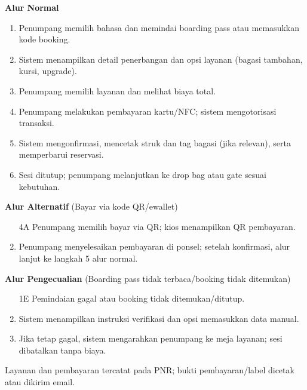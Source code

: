 \documentclass[a4paper]{article}
\begin{document}
\begin{enumerate}[itemsep=1em]
\begin{itemize}[itemsep=1em]
    \vspace{1em}

    \textbf{Alur Normal}
    \begin{enumerate}[nosep]
      \item Penumpang memilih bahasa dan memindai boarding pass atau memasukkan kode booking.
      \item Sistem menampilkan detail penerbangan dan opsi layanan (bagasi tambahan, kursi, upgrade).
      \item Penumpang memilih layanan dan melihat biaya total.
      \item Penumpang melakukan pembayaran kartu/NFC; sistem mengotorisasi transaksi.
      \item Sistem mengonfirmasi, mencetak struk dan tag bagasi (jika relevan), serta memperbarui reservasi.
      \item Sesi ditutup; penumpang melanjutkan ke drop bag atau gate sesuai kebutuhan.
    \end{enumerate}

    \vspace{1em}

    \textbf{Alur Alternatif} (Bayar via kode QR/ewallet)
    \begin{enumerate}[nosep]
      \item[4A] Penumpang memilih bayar via QR; kios menampilkan QR pembayaran.
      \item Penumpang menyelesaikan pembayaran di ponsel; setelah konfirmasi, alur lanjut ke langkah 5 alur normal.
    \end{enumerate}

    \vspace{1em}
    \textbf{Alur Pengecualian} (Boarding pass tidak terbaca/booking tidak ditemukan)
    \begin{enumerate}[nosep]
      \item[1E] Pemindaian gagal atau booking tidak ditemukan/ditutup.
      \item Sistem menampilkan instruksi verifikasi dan opsi memasukkan data manual.
      \item Jika tetap gagal, sistem mengarahkan penumpang ke meja layanan; sesi dibatalkan tanpa biaya.
    \end{enumerate}

    \vspace{1em}

    \begin{description}[leftmargin=0.5cm, style=nextline]
      \item[Post-condition] Layanan dan pembayaran tercatat pada PNR; bukti pembayaran/label dicetak atau dikirim email.
    \end{description}
  \end{itemize}


\end{enumerate}
\end{document}
